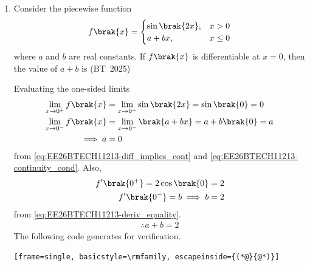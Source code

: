 \begin{enumerate}[label=\thesubsection.\arabic*, ref=\thesubsection.\theenumi,itemsep=0pt]
\begin{align}
\frac{d^2 y}{dt^2} &= C_1 e^t + C_2 e^{-t}
\end{align}
Substituting $y$, $\frac{dy}{dt}$, and $\frac{d^2 y}{dt^2}$ into 
    \eqref{eq:EE26BTECH11213-bt25_int-der},
\begin{align}
\brak{C_1 e^t + C_2 e^{-t}} + m\brak{C_1 e^t - C_2 e^{-t}} + n\brak{C_1 e^t + C_2 e^{-t}} &= 0
\\
\implies C_1 e^t \brak{1 + m + n} + C_2 e^{-t} \brak{1 - m + n} &= 0
\\
\text{or, }
m + n &= -1
\end{align}
\item Consider the piecewise function
\begin{align}
f\brak{x} = \begin{cases}
\sin\brak{2x}, & x > 0 \\
a + bx, & x \le 0
\end{cases}
\end{align}
where $a$ and $b$ are real constants. If $f\brak{x}$ is differentiable at $x = 0$, then the value of $a + b$ is
\hfill (BT~2025)
\begin{enumerate}[itemsep=0pt]
\end{enumerate}
\solution
Evaluating the one-sided limits
\begin{align}
	\lim_{x \to 0^+} f\brak{x} &= \lim_{x \to 0^+} \sin\brak{2x} = \sin\brak{0} = 0 \\
\lim_{x \to 0^-} f\brak{x} &= \lim_{x \to 0^-} \brak{a + bx} = a + b\brak{0} = a
\\
\implies
a &= 0
\end{align}
from \eqref{eq:EE26BTECH11213-diff_implies_cont} and \eqref{eq:EE26BTECH11213-continuity_cond}.
Also, 
\begin{align}
	f'\brak{0^+} = 2\cos\brak{0} &= 2
\\
	f'\brak{0^-} = b
	\implies b &= 2
\end{align}
from \eqref{eq:EE26BTECH11213-deriv_equality}.
\begin{align}
\therefore a + b = 2
\end{align}
The following code generates
     for verification.
\begin{lstlisting}[frame=single, basicstyle=\rmfamily, escapeinside={(*@}{@*)}]

\end{lstlisting}
\end{enumerate}
